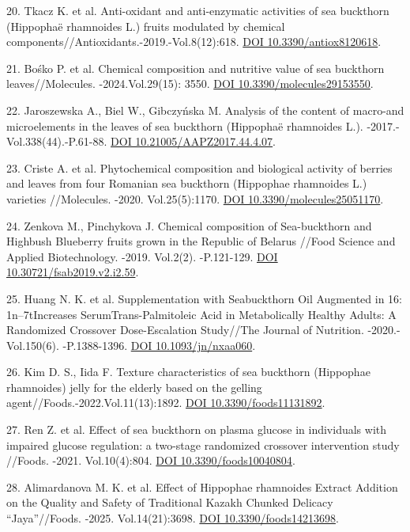 \begin{refs}
20. Tkacz K. et al. Anti-oxidant and anti-enzymatic activities of sea
buckthorn (Hippophaë rhamnoides L.) fruits modulated by chemical
components//Antioxidants.-2019.-Vol.8(12):618.
\href{https://doi.org/10.3390/antiox8120618}{DOI 10.3390/antiox8120618}.

21. Bośko P. et al. Chemical composition and nutritive value of sea
buckthorn leaves//Molecules. -2024.Vol.29(15): 3550.
\href{https://doi.org/10.3390/molecules29153550}{DOI
10.3390/molecules29153550}.

22. Jaroszewska A., Biel W., Gibczyńska M. Analysis of the content of
macro-and microelements in the leaves of sea buckthorn (Hippophaë
rhamnoides L.). -2017.-Vol.338(44).-P.61-88.
\href{https://doi.org/10.21005/AAPZ2017.44.4.07}{DOI
10.21005/AAPZ2017.44.4.07}.

23. Criste A. et al. Phytochemical composition and biological activity
of berries and leaves from four Romanian sea buckthorn (Hippophae
rhamnoides L.) varieties //Molecules. -2020. Vol.25(5):1170.
\href{https://doi.org/10.3390/molecules25051170}{DOI
10.3390/molecules25051170}.

24. Zenkova M., Pinchykova J. Chemical composition of Sea-buckthorn and
Highbush Blueberry fruits grown in the Republic of Belarus //Food
Science and Applied Biotechnology. -2019. Vol.2(2). -P.121-129.
\href{https://doi.org/10.30721/fsab2019.v2.i2.59}{DOI
10.30721/fsab2019.v2.i2.59}.

25. Huang N. K. et al. Supplementation with Seabuckthorn Oil Augmented
in 16: 1n--7tIncreases SerumTrans-Palmitoleic Acid in Metabolically
Healthy Adults: A Randomized Crossover Dose-Escalation Study//The
Journal of Nutrition. -2020.-Vol.150(6). -P.1388-1396.
\href{https://doi.org/10.1093/jn/nxaa060}{DOI 10.1093/jn/nxaa060}.

26. Kim D. S., Iida F. Texture characteristics of sea buckthorn
(Hippophae rhamnoides) jelly for the elderly based on the gelling
agent//Foods.-2022.Vol.11(13):1892.
\href{https://doi.org/10.3390/foods11131892}{DOI 10.3390/foods11131892}.

27. Ren Z. et al. Effect of sea buckthorn on plasma glucose in
individuals with impaired glucose regulation: a two-stage randomized
crossover intervention study //Foods. -2021. Vol.10(4):804.
\href{https://doi.org/10.3390/foods10040804}{DOI 10.3390/foods10040804}.

28. Alimardanova M. K. et al. Effect of Hippophae rhamnoides Extract
Addition on the Quality and Safety of Traditional Kazakh Chunked
Delicacy ``Jaya''//Foods. -2025. Vol.14(21):3698.
\href{https://doi.org/10.3390/foods14213698}{DOI 10.3390/foods14213698}.


\end{refs}
